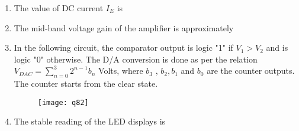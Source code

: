 \documentclass[a4paper, 11pt]{article}
\begin{document}
\begin{enumerate}
    \item The value of DC current $I_E$ is
    \begin{enumerate}
    \end{enumerate}

    \hfill{}
    
    \item The mid-band voltage gain of the amplifier is approximately
    \begin{enumerate}
    \end{enumerate}

    \hfill{}
    
    \item[] In the following circuit, the comparator output is logic "1" if $V_1 > V_2$ and is logic "0" otherwise. The D/A conversion is done as per the relation $V_{DAC} = \sum_{n=0}^{3} 2^{n-1}b_n$ Volts, where $b_3$ , $b_2, b_1$ and $b_0$  are the counter outputs. The counter starts from the clear state.
    \begin{figure}[H]
        \centering
        \texttt{[image: q82]}
        \caption*{}
        \label{fig:q82}
    \end{figure}
    
    \item The stable reading of the LED displays is
    \begin{enumerate}
    \end{enumerate}
    

\end{enumerate}
\end{document}
